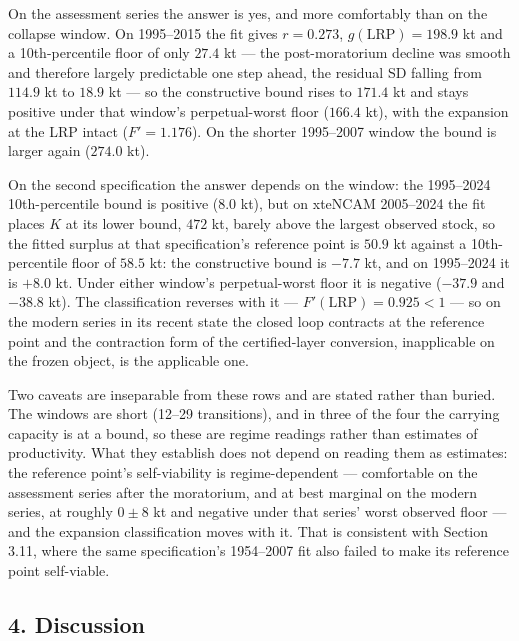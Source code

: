 \documentclass[11pt]{article}
\begin{document}
On the assessment series the answer is yes, and more comfortably than on the
collapse window. On 1995--2015 the fit gives \(r = 0.273\),
\(g(\mathrm{LRP}) = 198.9\) kt and a 10th-percentile floor of only
\(27.4\) kt --- the post-moratorium decline was smooth and therefore largely
predictable one step ahead, the residual SD falling from \(114.9\) kt to
\(18.9\) kt --- so the constructive bound rises to \(171.4\) kt and stays
positive under that window's perpetual-worst floor (\(166.4\) kt), with the
expansion at the LRP intact (\(F' = 1.176\)). On the shorter 1995--2007
window the bound is larger again (\(274.0\) kt).

On the second specification the answer depends on the window: the 1995--2024
10th-percentile bound is positive (\(8.0\) kt), but on xteNCAM 2005--2024 the fit
places \(K\) at its lower bound, \(472\) kt, barely above the largest
observed stock, so the fitted surplus at that specification's reference point
is \(50.9\) kt against a 10th-percentile floor of \(58.5\) kt: the
constructive bound is \(-7.7\) kt, and on 1995--2024 it is \(+8.0\) kt.
Under either window's perpetual-worst floor it is negative (\(-37.9\) and
\(-38.8\) kt). The classification reverses with it ---
\(F'(\mathrm{LRP}) = 0.925 < 1\) --- so on the modern series in its recent
state the closed loop contracts at the reference point and the contraction form
of the certified-layer conversion, inapplicable on the frozen object, is the
applicable one.

Two caveats are inseparable from these rows and are stated rather than buried.
The windows are short (12--29 transitions), and in three of the four the
carrying capacity is at a bound, so these are regime readings rather than
estimates of productivity. What they establish does not depend on reading them
as estimates: the reference point's self-viability is regime-dependent ---
comfortable on the assessment series after the moratorium, and at best marginal
on the modern series, at roughly \(0 \pm 8\) kt and negative under that
series' worst observed floor --- and the expansion classification moves with
it. That is consistent with Section 3.11, where the same specification's
1954--2007 fit also failed to make its reference point self-viable.

\subsection{4. Discussion}\label{budget-discussion}
\end{document}
